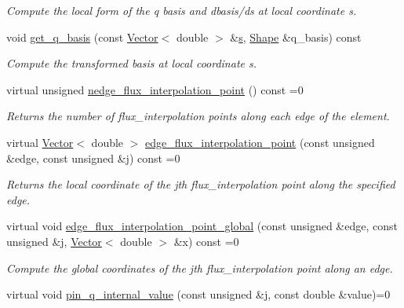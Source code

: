 \begin{DoxyCompactItemize}
\begin{DoxyCompactList}\small\item\em Compute the local form of the q basis and dbasis/ds at local coordinate s. \end{DoxyCompactList}\item 
void \hyperlink{classoomph_1_1AxisymmetricPoroelasticityEquations_a710ff51050c22c6f15941d62ab15b3fa}{get\+\_\+q\+\_\+basis} (const \hyperlink{classoomph_1_1Vector}{Vector}$<$ double $>$ \&\hyperlink{cfortran_8h_ab7123126e4885ef647dd9c6e3807a21c}{s}, \hyperlink{classoomph_1_1Shape}{Shape} \&q\+\_\+basis) const
\begin{DoxyCompactList}\small\item\em Compute the transformed basis at local coordinate s. \end{DoxyCompactList}\item 
virtual unsigned \hyperlink{classoomph_1_1AxisymmetricPoroelasticityEquations_a16d82c2d6bf7f84f6529f4182f83e6ef}{nedge\+\_\+flux\+\_\+interpolation\+\_\+point} () const =0
\begin{DoxyCompactList}\small\item\em Returns the number of flux\+\_\+interpolation points along each edge of the element. \end{DoxyCompactList}\item 
virtual \hyperlink{classoomph_1_1Vector}{Vector}$<$ double $>$ \hyperlink{classoomph_1_1AxisymmetricPoroelasticityEquations_ad7406482ea1f004642ca1de325a3efd3}{edge\+\_\+flux\+\_\+interpolation\+\_\+point} (const unsigned \&edge, const unsigned \&j) const =0
\begin{DoxyCompactList}\small\item\em Returns the local coordinate of the jth flux\+\_\+interpolation point along the specified edge. \end{DoxyCompactList}\item 
virtual void \hyperlink{classoomph_1_1AxisymmetricPoroelasticityEquations_a94eb24ad4a608057dd8601bbac14f241}{edge\+\_\+flux\+\_\+interpolation\+\_\+point\+\_\+global} (const unsigned \&edge, const unsigned \&j, \hyperlink{classoomph_1_1Vector}{Vector}$<$ double $>$ \&x) const =0
\begin{DoxyCompactList}\small\item\em Compute the global coordinates of the jth flux\+\_\+interpolation point along an edge. \end{DoxyCompactList}\item 
virtual void \hyperlink{classoomph_1_1AxisymmetricPoroelasticityEquations_a7d59c7c592e2c45e2cd7865295a36eed}{pin\+\_\+q\+\_\+internal\+\_\+value} (const unsigned \&j, const double \&value)=0

\end{DoxyCompactItemize}
